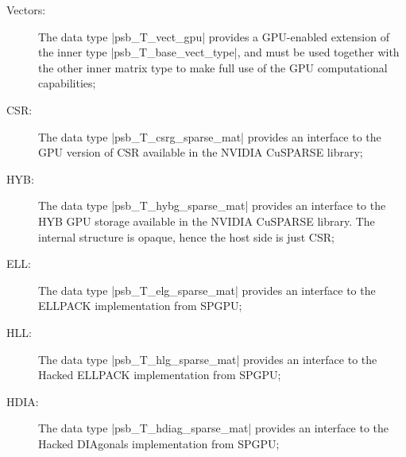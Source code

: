 \begin{description}
\item[Vectors:] The data type \fortinline|psb_T_vect_gpu| provides a
  GPU-enabled extension of the inner type \fortinline|psb_T_base_vect_type|,
  and must be used together with the other inner matrix type to make
  full use of the GPU computational capabilities;
\item[CSR:] The data type \fortinline|psb_T_csrg_sparse_mat| provides an
  interface to the GPU version of CSR available in the NVIDIA CuSPARSE
  library;
\item[HYB:] The data type \fortinline|psb_T_hybg_sparse_mat| provides an
  interface to the HYB GPU storage  available in the NVIDIA CuSPARSE
  library. The internal structure is opaque, hence the host side is
  just CSR;
\item[ELL:] The data type \fortinline|psb_T_elg_sparse_mat| provides an
  interface to the  ELLPACK implementation from SPGPU;

\item[HLL:] The data type \fortinline|psb_T_hlg_sparse_mat| provides an
  interface to the  Hacked ELLPACK implementation from SPGPU;
\item[HDIA:] The data type \fortinline|psb_T_hdiag_sparse_mat| provides an
  interface to the  Hacked DIAgonals implementation from SPGPU;
\end{description}


